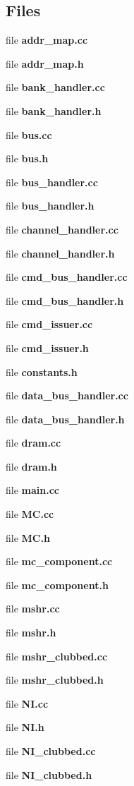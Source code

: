\subsection*{Files}
\begin{CompactItemize}
\item 
file {\bf addr\_\-map.cc}
\item 
file {\bf addr\_\-map.h}
\item 
file {\bf bank\_\-handler.cc}
\item 
file {\bf bank\_\-handler.h}
\item 
file {\bf bus.cc}
\item 
file {\bf bus.h}
\item 
file {\bf bus\_\-handler.cc}
\item 
file {\bf bus\_\-handler.h}
\item 
file {\bf channel\_\-handler.cc}
\item 
file {\bf channel\_\-handler.h}
\item 
file {\bf cmd\_\-bus\_\-handler.cc}
\item 
file {\bf cmd\_\-bus\_\-handler.h}
\item 
file {\bf cmd\_\-issuer.cc}
\item 
file {\bf cmd\_\-issuer.h}
\item 
file {\bf constants.h}
\item 
file {\bf data\_\-bus\_\-handler.cc}
\item 
file {\bf data\_\-bus\_\-handler.h}
\item 
file {\bf dram.cc}
\item 
file {\bf dram.h}
\item 
file {\bf main.cc}
\item 
file {\bf MC.cc}
\item 
file {\bf MC.h}
\item 
file {\bf mc\_\-component.cc}
\item 
file {\bf mc\_\-component.h}
\item 
file {\bf mshr.cc}
\item 
file {\bf mshr.h}
\item 
file {\bf mshr\_\-clubbed.cc}
\item 
file {\bf mshr\_\-clubbed.h}
\item 
file {\bf NI.cc}
\item 
file {\bf NI.h}
\item 
file {\bf NI\_\-clubbed.cc}
\item 
file {\bf NI\_\-clubbed.h}
\item 

\end{CompactItemize}

